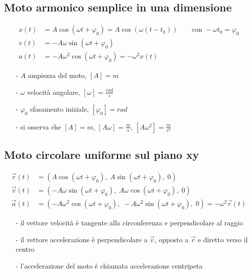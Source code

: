 \documentclass[a4paper]{article}
\begin{document}
\newpage

\subsection{Moto armonico semplice in una dimensione}
\begin{align*}
	x(t) &= A \cos (\omega t + \varphi_0) = A \cos (\omega (t - t_0)) \qquad \text{con } -\omega t_0 = \varphi_0 \\
	v(t) &= - A \omega \sin (\omega t + \varphi_0) \\
	a(t) &= -A \omega^2 \cos (\omega t + \varphi_0) = -\omega^2 x(t)
\end{align*}
\begin{itemize}[topsep=3pt, itemsep=0pt]
	\item[-] \(A\) ampiezza del moto, \(\left[A\right] = m\)
	\item[-] \(\omega\) velocità angolare, \(\left[\omega\right] = \frac{rad}{s}\)
	\item[-] \(\varphi_0\) sfasamento iniziale, \(\left[\varphi_0\right] = rad\)
	\item[-] si osserva che \(\left[A\right] = m\), \(\left[A\omega\right] = \frac{m}{s}\), \(\left[A\omega^2\right] = \frac{m}{s^2}\)
\end{itemize}

\subsection{Moto circolare uniforme sul piano xy}
\begin{align*}
	\vec{r}(t) &= \left(A \cos (\omega t + \varphi_0), \; A \sin (\omega t + \varphi_0), \; 0\right) \\
	\vec{v}(t) &= \left(-A \omega \sin (\omega t + \varphi_0), \; A \omega \cos (\omega t + \varphi_0), \; 0 \right) \\
	\vec{a}(t) &= \left(-A \omega^2 \cos (\omega t + \varphi_0), \; -A \omega^2 \sin (\omega t + \varphi_0), \; 0 \right) = -\omega^2 \vec{r}(t)
\end{align*}
\begin{itemize}[topsep=3pt, itemsep=0pt]
	\item[-] il vettore velocità è tangente alla circonferenza e perpendicolare al raggio
	\item[-] il vettore accelerazione è perpendicolare a \(\vec{v}\), opposto a \(\vec{r}\) e diretto verso il centro
	\item[-] l'accelerazione del moto è chiamata accelerazione centripeta
\end{itemize}
\end{document}
